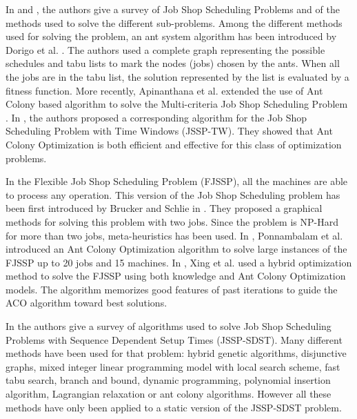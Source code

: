 \documentclass[a4paper,12pt]{article}
\begin{document}
In \cite{Jain1999} and \cite{Brucker2010}, the authors give a survey of Job Shop Scheduling Problems and of the methods used to solve the different sub-problems.
Among the different methods used for solving the problem, an ant system algorithm has been introduced by Dorigo et al. \cite{Dorigo1994}. The authors used a complete graph representing the possible schedules and tabu lists to mark the nodes (jobs) chosen by the ants. When all the jobs are in the tabu list, the solution represented by the list is evaluated by a fitness function. More recently, Apinanthana et al. extended the use of Ant Colony based algorithm to solve the Multi-criteria Job Shop Scheduling Problem \cite{Apinanthana2011}.
In \cite{Huang2008}, the authors proposed a corresponding algorithm for the Job Shop Scheduling Problem with Time Windows (JSSP-TW). They showed that Ant Colony Optimization is both efficient and effective for this class of optimization problems.

In the Flexible Job Shop Scheduling Problem (FJSSP), all the machines are able to process any operation. This version of the Job Shop Scheduling problem has been first introduced by Brucker and Schlie in \cite{Brucker1990}. They proposed a graphical methods for solving this problem with two jobs. Since the problem is NP-Hard for more than two jobs, meta-heuristics has been used. In \cite{Ponnambalam2005}, Ponnambalam et al. introduced an Ant Colony Optimization algorithm to solve large instances of the FJSSP up to 20 jobs and 15 machines. In \cite{Xing2010}, Xing et al. used a hybrid optimization method to solve the FJSSP using both knowledge and Ant Colony Optimization models. The algorithm memorizes good features of past iterations to guide the ACO algorithm toward best solutions.

In \cite{Allahverdi2008} the authors give a survey of algorithms used to solve Job Shop Scheduling Problems with Sequence Dependent Setup Times (JSSP-SDST). Many different methods have been used for that problem: hybrid genetic algorithms, disjunctive graphs, mixed integer linear programming model with local search scheme, fast tabu search, branch and bound, dynamic programming, polynomial insertion algorithm, Lagrangian relaxation or ant colony algorithms. However all these methods have only been applied to a static version of the JSSP-SDST problem.\\%
\end{document}
